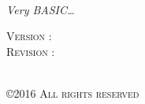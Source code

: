 \makeatletter
	\begin{titlepage}
	\centering
    		\hfill
    		\hfill
    		\hfill
    		\hfill
    		\hfill
      	\hfill
    \vspace{1cm}
    \vfill
    		{\Huge \textbf{\@title}} \\
    		\vspace{1em}
    		{\Large \textsl{Very BASIC…}}\\
    	\vspace{4em}
    	\begin{flushleft}
		{\LARGE \textsc{Version : \VersionDocument\\
			Revision : \RevisionDocument\\
			}\vspace{2em}	
        		\@author\\
		}    		
    		
    	\end{flushleft}

    		
    \vfill
    		{\Large \textsc{\copyright 2016 All rights reserved}} \\
	\end{titlepage}
\makeatother
